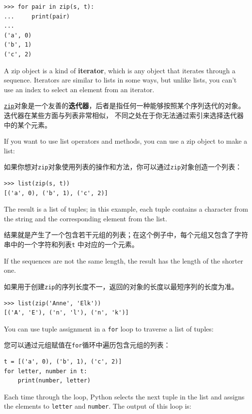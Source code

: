 \begin{lstlisting}
>>> for pair in zip(s, t):
...     print(pair)
...
('a', 0)
('b', 1)
('c', 2)
\end{lstlisting}

%
A zip object is a kind of {\bf iterator}, which is any object
that iterates through a sequence.  Iterators are similar to lists in some
ways, but unlike lists, you can't use an index to select an element from
an iterator.

\href{https://docs.python.org/3/library/functions.html#zip}{\lstinline{zip}}对象是一个友善的\textbf{迭代器}，后者是指任何一种能够按照某个序列迭代的对象。 迭代器在某些方面与列表非常相似， 不同之处在于你无法通过索引来选择迭代器中的某个元素。
 

If you want to use list operators and methods, you can
use a zip object to make a list:

如果你想对\lstinline {zip}对象使用列表的操作和方法，你可以通过\lstinline {zip}对象创造一个列表：

\begin{lstlisting}
>>> list(zip(s, t))
[('a', 0), ('b', 1), ('c', 2)]
\end{lstlisting}

%
The result is a list of tuples; in this example, each tuple contains
a character from the string and the corresponding element from
the list.

结果就是产生了一个包含若干元组的列表；在这个例子中，每个元组又包含了字符串中的一个字符和列表\lstinline {t} 中对应的一个元素。

If the sequences are not the same length, the result has the
length of the shorter one.

如果用于创建\lstinline{zip}的序列长度不一，返回的对象的长度以最短序列的长度为准。

\begin{lstlisting}
>>> list(zip('Anne', 'Elk'))
[('A', 'E'), ('n', 'l'), ('n', 'k')]
\end{lstlisting}
%
You can use tuple assignment in a {\tt for} loop to traverse a list of
tuples:

您可以通过元组赋值在\lstinline{for}循环中遍历包含元组的列表：
  

\begin{lstlisting}
t = [('a', 0), ('b', 1), ('c', 2)]
for letter, number in t:
    print(number, letter)
\end{lstlisting}
%
Each time through the loop, Python selects the next tuple in
the list and assigns the elements to {\tt letter} and
{\tt number}.  The output of this loop is:

